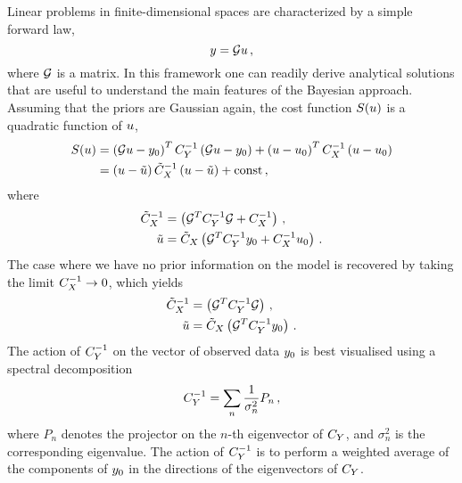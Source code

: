 Linear problems in finite-dimensional spaces are characterized by a simple
forward law, 
\begin{equation}
  \label{eq:MatrixG}
  y = \mathcal{G} u\, ,
\end{equation}
where $\mathcal{G}$ is a matrix. In this framework one can readily  derive
analytical solutions that are useful to understand the main features of the
Bayesian approach. Assuming that the priors are Gaussian again, the cost
function $S(u)$ is a quadratic function of $u$,
\begin{align}
  \label{eq:CostLinGauss}
  S(u) &= 
  \left(\mathcal{G} u - y_0 \right)^T C_{Y}^{-1} 
  \left(\mathcal{G} u - y_0 \right) + 
  \left( u - u_0 \right)^T C_X^{-1} \left(u - u_0 \right) \\
  &= 
  \left(u - \tilde{u}\right) \tilde{C}_X^{-1}
  \left(u - \tilde{u}\right) + \mathrm{const}\, ,
\end{align} 
where
\begin{align}
  \label{eq:PostParamsCov}
  \tilde{C}_X^{-1} &= 
  \left(
    \mathcal{G}^T C_{Y}^{-1} \mathcal{G} + C_X^{-1}
  \right)\, , \\
  \label{eq:PostParamsMean}
  \tilde{u} &=
  \tilde{C}_X  \left(
    \mathcal{G}^T C_{Y}^{-1} y_0 + C_X^{-1} u_0
  \right)\, .
\end{align}
The case where we have no prior information on the model is recovered by taking
the limit $C_X^{-1} \to 0$, which yields
\begin{align}
  \label{eq:NoPriorLinModel}
  \tilde{C}_X^{-1} &= 
  \left(
    \mathcal{G}^T C_{Y}^{-1} \mathcal{G}
  \right)\, , \\
  \tilde{u} &=
  \tilde{C}_X  \left(
    \mathcal{G}^T C_{Y}^{-1} y_0 
  \right)\, . \label{eq:NoPriorLinModelCov}
\end{align}
The action of $C_{Y}^{-1}$ on the vector of observed data $y_0$
is best visualised using a spectral decomposition
\begin{equation}
  \label{eq:CDSpecDec}
  C_{Y}^{-1} = \sum_n \frac{1}{\sigma_n^2} P_n\, ,
\end{equation}
where $P_n$ denotes the projector on the $n$-th eigenvector of $C_{Y}$,
and $\sigma_n^2$ is the corresponding eigenvalue. The action of
$C_{Y}^{-1}$ is to perform a weighted average of the components of
$y_0$ in the directions of the eigenvectors of $C_{Y}$.

